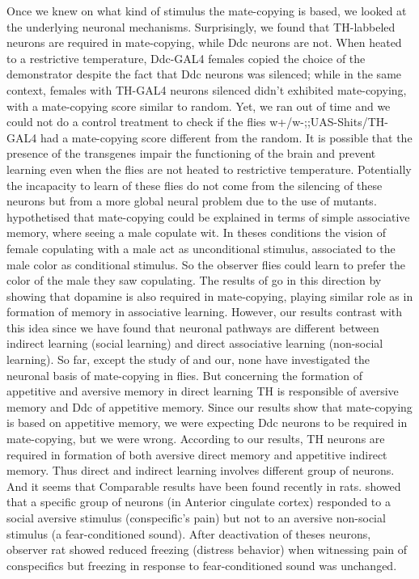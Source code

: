 \documentclass[a4paper, 12pt]{article}
\begin{document}
Once we knew on what kind of stimulus the mate-copying is based, we looked at the underlying neuronal mechanisms. 
Surprisingly, we found that TH-labbeled neurons are required in mate-copying, while Ddc neurons are not. 
When heated to a restrictive temperature, Ddc-GAL4 females copied the choice of the demonstrator despite the fact that Ddc neurons was silenced; while in the same context, females with TH-GAL4 neurons silenced didn't exhibited mate-copying, with a mate-copying score similar to random. Yet, we ran out of time and we could not do a control treatment to check if the flies w+/w-;;UAS-Shits/TH-GAL4 had a mate-copying score different from the random. It is possible that the presence of the transgenes impair the functioning of the brain and prevent learning even when the flies are not heated to restrictive temperature. Potentially the incapacity to learn of these flies do not come from the silencing of these neurons but from a more global neural problem due to the use of mutants.
\textcite{alvargues_information_2015} hypothetised that mate-copying could be explained in terms of simple associative memory, where seeing a male copulate wit. In theses conditions the vision of female copulating with a male act as unconditional stimulus, associated to the male color as conditional stimulus. So the observer flies could learn to prefer the color of the male they saw copulating. The results of \textcite{monier_dopamine_2018} go in this direction by showing that dopamine is also required in mate-copying, playing similar role as in formation of memory in associative learning. However, our results contrast with this idea since we have found that neuronal pathways are different between indirect learning (social learning) and direct associative learning (non-social learning).
So far, except the study of \textcite{monier_dopamine_2018} and our, none have investigated the neuronal basis of mate-copying in flies. But concerning the formation of appetitive and aversive memory in direct learning TH is responsible of aversive memory and Ddc of appetitive memory. Since our results show that mate-copying is based on appetitive memory, we were expecting Ddc neurons to be required in mate-copying, but we were wrong.
According to our results, TH neurons are required in formation of both aversive direct memory and appetitive indirect memory. 
Thus direct and indirect learning involves different group of neurons. 
And it seems that
Comparable results have been found recently in rats. \textcite{carrillo_emotional_2018} showed that a specific group of neurons (in Anterior cingulate cortex) responded to a social aversive stimulus (conspecific's pain) but not to an aversive non-social stimulus (a fear-conditioned sound). After deactivation of theses neurons, observer rat showed reduced freezing (distress behavior) when witnessing pain of conspecifics but freezing in response to fear-conditioned sound was unchanged.
\end{document}
